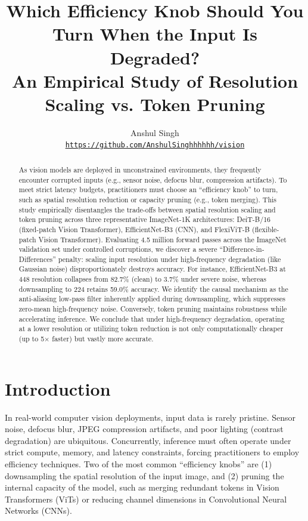 \documentclass[10pt,twocolumn,letterpaper]{article}
\begin{document}
\title{Which Efficiency Knob Should You Turn When the Input Is Degraded?\\
\large An Empirical Study of Resolution Scaling vs. Token Pruning}

\author{
Anshul Singh\\
{\tt\small \url{https://github.com/AnshulSinghhhhhh/vision}}
}

\maketitle

\begin{abstract}
As vision models are deployed in unconstrained environments, they frequently encounter corrupted inputs (e.g., sensor noise, defocus blur, compression artifacts). To meet strict latency budgets, practitioners must choose an ``efficiency knob'' to turn, such as spatial resolution reduction or capacity pruning (e.g., token merging). This study empirically disentangles the trade-offs between spatial resolution scaling and token pruning across three representative ImageNet-1K architectures: DeiT-B/16 (fixed-patch Vision Transformer), EfficientNet-B3 (CNN), and FlexiViT-B (flexible-patch Vision Transformer). Evaluating 4.5 million forward passes across the ImageNet validation set under controlled corruptions, we discover a severe ``Difference-in-Differences'' penalty: scaling input resolution under high-frequency degradation (like Gaussian noise) disproportionately destroys accuracy. For instance, EfficientNet-B3 at 448 resolution collapses from 82.7\% (clean) to 3.7\% under severe noise, whereas downsampling to 224 retains 59.0\% accuracy. We identify the causal mechanism as the anti-aliasing low-pass filter inherently applied during downsampling, which suppresses zero-mean high-frequency noise. Conversely, token pruning maintains robustness while accelerating inference. We conclude that under high-frequency degradation, operating at a lower resolution or utilizing token reduction is not only computationally cheaper (up to 5$\times$ faster) but vastly more accurate.
\end{abstract}

\section{Introduction}

In real-world computer vision deployments, input data is rarely pristine. Sensor noise, defocus blur, JPEG compression artifacts, and poor lighting (contrast degradation) are ubiquitous. Concurrently, inference must often operate under strict compute, memory, and latency constraints, forcing practitioners to employ efficiency techniques. Two of the most common ``efficiency knobs'' are (1) downsampling the spatial resolution of the input image, and (2) pruning the internal capacity of the model, such as merging redundant tokens in Vision Transformers (ViTs) or reducing channel dimensions in Convolutional Neural Networks (CNNs).
\end{document}
